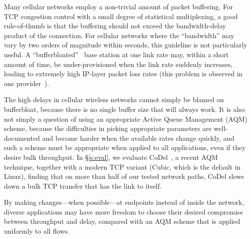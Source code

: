 
Many cellular networks employ a non-trivial amount of packet
buffering. For TCP congestion control with a small degree of
statistical multiplexing, a good rule-of-thumb is that the buffering
should not exceed the bandwidth-delay product of the connection. For
cellular networks where the ``bandwidth'' may vary by two orders of
magnitude within seconds, this guideline is not particularly useful. A
``bufferbloated''~\cite{bufferbloat} base station at one link rate
may, within a short amount of time, be under-provisioned when the link
rate suddenly increases, leading to extremely high IP-layer packet
loss rates (this problem is observed in one
provider~\cite{Mahajan12}).

The high delays in cellular wireless networks cannot simply be blamed
on bufferbloat, because there is no single buffer size that will
always work. It is also not simply a question of using an appropriate
Active Queue Management (AQM) scheme, because the difficulties in
picking appropriate parameters are well-documented and become harder
when the available rates change quickly, and such a scheme must be
appropriate when applied to all applications, even if they desire bulk
throughput. In \S\ref{s:eval}, we evaluate CoDel~\cite{CoDel}, a
recent AQM technique, together with a modern TCP variant (Cubic, which
is the default in Linux), finding that on more than half of our tested
network paths, CoDel slows down a bulk TCP transfer that has the link
to itself.
%

By making changes---when possible---at endpoints
instead of inside the network, diverse applications may have more
freedom to choose their desired compromise between throughput and
delay, compared with an AQM scheme that is applied uniformly to all
flows.


